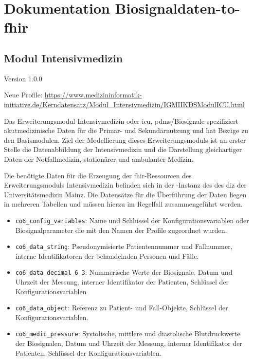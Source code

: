 \chapter{Dokumentation Biosignaldaten-to-\acs{fhir}} \label{ch:docutranf}

\section{Modul Intensivmedizin} \label{sec:docutransfer}

Version 1.0.0

\noindent Neue Profile: \url{https://www.medizininformatik-initiative.de/Kerndatensatz/Modul_Intensivmedizin/IGMIIKDSModulICU.html}


Das Erweiterungsmodul Intensivmedizin oder \ac{icu}, \acs{pdms}/Biosignale spezifiziert akutmedizinische Daten für die Primär- und Sekundärnutzung und hat Bezüge zu den Basismodulen. Ziel der Modellierung dieses Erweiterungsmoduls ist an erster Stelle die Datenabbildung der Intensivmedizin und die Darstellung gleichartiger Daten der Notfallmedizin, stationärer und ambulanter Medizin.

Die benötigte Daten für die Erzeugung der \ac{fhir}-Ressourcen des Erweiterungsmoduls Intensivmedizin befinden sich in der -Instanz des  des \ac{diz} der Universitätsmedizin Mainz. Die Datensätze für die Überführung der Daten liegen in mehreren Tabellen und müssen hierzu im Regelfall zusammengeführt werden.

\begin{itemize}
  \item \texttt{co6\_config\_variables}: Name und Schlüssel der Konfigurationsvariablen oder Biosignalparameter die mit den Namen der Profile zugeordnet wurden.
  \item \texttt{co6\_data\_string}: Pseudonymisierte Patientennummer und Fallnummer, interne Identifikatoren der behandelnden Personen und Fälle.
  \item \texttt{co6\_data\_decimal\_6\_3}: Nummerische Werte der Biosignale, Datum und Uhrzeit der Messung, interner Identifikator der Patienten, Schlüssel der Konfigurationsvariablen
  \item \texttt{co6\_data\_object}: Referenz zu Patient- und Fall-Objekte, Schlüssel der Konfigurationsvariablen.
  \item \texttt{co6\_medic\_pressure}: Systolische, mittlere und diastolische Blutdruckwerte der Biosignalen, Datum und Uhrzeit der Messung, interner Identifikator der Patienten, Schlüssel der Konfigurationsvariablen.
\end{itemize}
\vspace{4mm}

